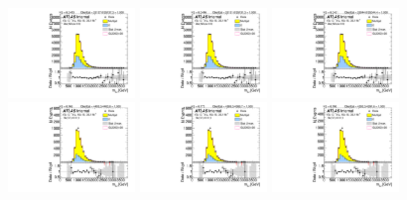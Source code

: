 \begin{figure}[htbp!]
\begin{center}
\includegraphics[width=0.3\textwidth,angle=-90]{figures/boosted/AppendixResveto/Moriond_TwoTag_split_Sideband_mHH_l.pdf}
\includegraphics[width=0.3\textwidth,angle=-90]{figures/boosted/AppendixResveto/Moriond_resveto_TwoTag_split_Sideband_mHH_l.pdf}
\includegraphics[width=0.3\textwidth,angle=-90]{figures/boosted/AppendixResveto/Moriond_fullresveto_TwoTag_split_Sideband_mHH_l.pdf}\\
\includegraphics[width=0.3\textwidth,angle=-90]{figures/boosted/AppendixResveto/Moriond_ThreeTag_Sideband_mHH_l.pdf}
\includegraphics[width=0.3\textwidth,angle=-90]{figures/boosted/AppendixResveto/Moriond_resveto_ThreeTag_Sideband_mHH_l.pdf}
\includegraphics[width=0.3\textwidth,angle=-90]{figures/boosted/AppendixResveto/Moriond_fullresveto_ThreeTag_Sideband_mHH_l.pdf}\\

\end{center}
\end{figure}
